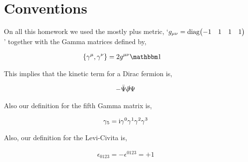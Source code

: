 \section{Conventions}

On all this homework we used the mostly plus metric, `$g_{\mu\nu}=\textnormal{diag}\mqty(-1&1&1&1)$' 
together with the Gamma matrices defined by,

\begin{align}
    \acomm{\gamma^\mu}{\gamma^\nu}&=2g^{\mu\nu}\mathbbm 1\nonumber
\end{align}

This implies that the kinetic term for a Dirac fermion is,

\begin{align}
    -\bar\Psi\slashed\partial\Psi\nonumber
\end{align}

Also our definition for the fifth Gamma matrix is,

\begin{align}
    \gamma_5=\textnormal{i}\gamma^0\gamma^1\gamma^2\gamma^3\nonumber
\end{align}

Also, our definition for the Levi-Civita is,

\begin{align}
    \epsilon_{0123}=-\epsilon^{0123}=+1\nonumber
\end{align}